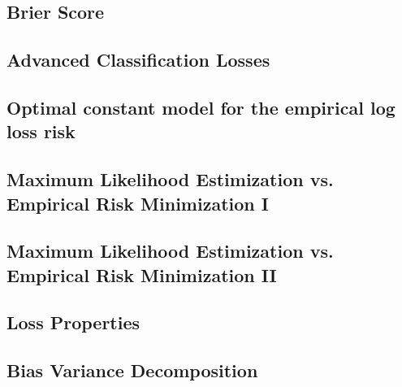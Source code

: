 \subsection{Brier Score}


\subsection{Advanced Classification Losses}


\subsection{Optimal constant model for the empirical log loss risk}


\subsection{Maximum Likelihood Estimization vs. Empirical Risk Minimization I}


\subsection{Maximum Likelihood Estimization vs. Empirical Risk Minimization II}


\subsection{Loss Properties}


\subsection{Bias Variance Decomposition}


